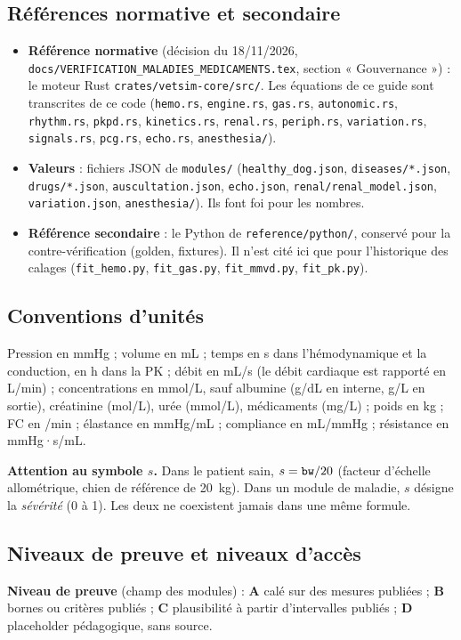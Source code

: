 \documentclass[10pt,a4paper]{article}
\newcommand{\cmd}[1]{\texttt{#1}}
\newcommand{\vp}[1]{\text{\texttt{\detokenize{#1}}}}
\newcommand{\evA}{\textcolor{green!45!black}{\textbf{A}}}
\newcommand{\evB}{\textcolor{green!45!black}{\textbf{B}}}
\newcommand{\evC}{\textcolor{orange!80!black}{\textbf{C}}}
\newcommand{\evD}{\textcolor{red!70!black}{\textbf{D}}}
\begin{document}
\subsection{Références normative et secondaire}
\begin{itemize}
\item \textbf{Référence normative} (décision du 18/11/2026, \cmd{docs/VERIFICATION\_MALADIES\_MEDICAMENTS.tex}, section « Gouvernance ») : le moteur Rust \cmd{crates/vetsim-core/src/}. Les équations de ce guide sont transcrites de ce code (\cmd{hemo.rs}, \cmd{engine.rs}, \cmd{gas.rs}, \cmd{autonomic.rs}, \cmd{rhythm.rs}, \cmd{pkpd.rs}, \cmd{kinetics.rs}, \cmd{renal.rs}, \cmd{periph.rs}, \cmd{variation.rs}, \cmd{signals.rs}, \cmd{pcg.rs}, \cmd{echo.rs}, \cmd{anesthesia/}).
\item \textbf{Valeurs} : fichiers JSON de \cmd{modules/} (\cmd{healthy\_dog.json}, \cmd{diseases/*.json}, \cmd{drugs/*.json}, \cmd{auscultation.json}, \cmd{echo.json}, \cmd{renal/renal\_model.json}, \cmd{variation.json}, \cmd{anesthesia/}). Ils font foi pour les nombres.
\item \textbf{Référence secondaire} : le Python de \cmd{reference/python/}, conservé pour la contre-vérification (golden, fixtures). Il n'est cité ici que pour l'historique des calages (\cmd{fit\_hemo.py}, \cmd{fit\_gas.py}, \cmd{fit\_mmvd.py}, \cmd{fit\_pk.py}).
\end{itemize}

\subsection{Conventions d'unités}
Pression en mmHg ; volume en mL ; temps en s dans l'hémodynamique et la conduction, en h dans la PK ; débit en mL/s (le débit cardiaque est rapporté en L/min) ; concentrations en mmol/L, sauf albumine (g/dL en interne, g/L en sortie), créatinine (\textmu mol/L), urée (mmol/L), médicaments (mg/L) ; poids \vp{bw} en kg ; FC en /min ; élastance en mmHg/mL ; compliance en mL/mmHg ; résistance en mmHg·s/mL.

\textbf{Attention au symbole $s$.} Dans le patient sain, $s = \vp{bw}/20$ (facteur d'échelle allométrique, chien de référence de 20~kg). Dans un module de maladie, $s$ désigne la \emph{sévérité} (0 à 1). Les deux ne coexistent jamais dans une même formule.

\subsection{Niveaux de preuve et niveaux d'accès}
\textbf{Niveau de preuve} (champ \vp{evidence} des modules) :
\evA{} calé sur des mesures publiées ; \evB{} bornes ou critères publiés ; \evC{} plausibilité à partir d'intervalles publiés ; \evD{} placeholder pédagogique, sans source.
\end{document}
